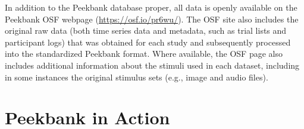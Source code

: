 \documentclass[
  english,
  man,floatsintext]{apa6}
\providecommand{\DIFdeltex}[1]{}                      %
\providecommand{\DIFdelbegin}{} %
\providecommand{\DIFdelend}{} %
\providecommand{\DIFdel}[1]{\texorpdfstring{\DIFdeltex{#1}}{}} %
\newcommand{\DIFscaledelfig}{0.5}
\newlength{\DIFdelgraphicswidth} %
\newlength{\DIFdelgraphicsheight} %
\newcommand{\DIFdelincludegraphics}[2][]{%
\sbox{\DIFdelgraphicsbox}{\DIFOincludegraphics[#1]{#2}}%
\settoboxwidth{\DIFdelgraphicswidth}{\DIFdelgraphicsbox} %
\settoboxtotalheight{\DIFdelgraphicsheight}{\DIFdelgraphicsbox} %
\scalebox{\DIFscaledelfig}{%
\parbox[b]{\DIFdelgraphicswidth}{\usebox{\DIFdelgraphicsbox}\\[-\baselineskip] \rule{\DIFdelgraphicswidth}{0em}}\llap{\resizebox{\DIFdelgraphicswidth}{\DIFdelgraphicsheight}{%
\setlength{\unitlength}{\DIFdelgraphicswidth}%
\begin{picture}(1,1)%
\thicklines\linethickness{2pt} %
{\color[rgb]{1,0,0}\put(0,0){\framebox(1,1){}}}%
{\color[rgb]{1,0,0}\put(0,0){\line( 1,1){1}}}%
{\color[rgb]{1,0,0}\put(0,1){\line(1,-1){1}}}%
\end{picture}%
}\hspace*{3pt}}} %
} %
\DeclareRobustCommand{\DIFdelbegin}{\DIFOdelbegin \let\includegraphics\DIFdelincludegraphics} %
\DeclareRobustCommand{\DIFdelend}{\DIFOaddend \let\includegraphics\DIFOincludegraphics} %
\begin{document}
In addition to the Peekbank database proper, all data is openly available on the Peekbank OSF webpage (\url{https://osf.io/pr6wu/}).
The OSF site also includes the original raw data (both time series data and metadata, such as trial lists and participant logs) that was obtained for each study and subsequently processed into the standardized Peekbank format.
\DIFdelbegin \DIFdel{Users who are interested in inspecting or reproducing the processing pipeline for a given dataset can use the respective import script (openly available on GitHub, }%
\DIFdel{) to download and process the raw data from OSF into its final standardized format.
}\DIFdelend Where available, the OSF page also includes additional information about the stimuli used in each dataset, including in some instances the original stimulus sets (e.g., image and audio files).

\hypertarget{peekbank-in-action}{%
\section{Peekbank in Action}\label{peekbank-in-action}}
\end{document}
